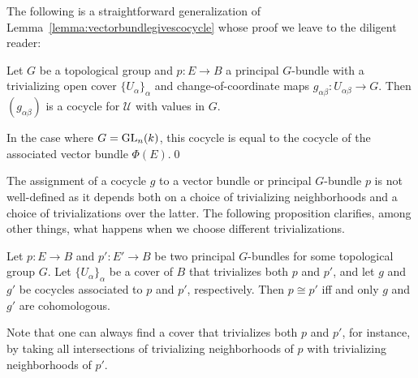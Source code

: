 \documentclass[a4paper,openany]{scrbook}
\begin{document}
The following is a straightforward generalization of Lemma~\ref{lemma:vectorbundlegivescocycle} whose proof we leave to the diligent reader:

\begin{lemma}\label{lemma:principalbundlegivescocycle}
Let $G$ be a topological group and $p\colon E \to B$ a principal $G$-bundle with a trivializing open cover $\{U_\alpha\}_{\alpha}$ and change-of-coordinate maps $g_{\alpha\beta}\colon U_{\alpha\beta} \to G$. Then $(g_{\alpha\beta})$ is a cocycle for $\mathcal U$ with values in $G$.

In the case where $G=\operatorname{GL}_n(k)$, this cocycle is equal to the cocycle of the associated vector bundle $\Phi(E)$.\qed
\end{lemma}

\bigskip

The assignment of a cocycle $g$ to a vector bundle or principal $G$-bundle $p$ is not well-defined as it depends both on a choice of trivializing neighborhoods and a choice of trivializations over the latter. The following proposition clarifies, among other things, what happens when we choose different trivializations.

\begin{prop}\label{prop:cocycleisomorphisms}
Let $p\colon E \to B$ and $p'\colon E' \to B$ be two principal $G$-bundles for some topological group $G$. Let $\{U_\alpha\}_\alpha$ be a cover of $B$ that trivializes both $p$ and $p'$, and let $g$ and $g'$ be cocycles associated to $p$ and $p'$, respectively. Then $p \cong p'$ iff and only $g$ and $g'$ are cohomologous.
\end{prop}
Note that one can always find a cover that trivializes both $p$ and $p'$, for instance, by taking all intersections of trivializing neighborhoods of $p$ with trivializing neighborhoods of $p'$.
\end{document}

